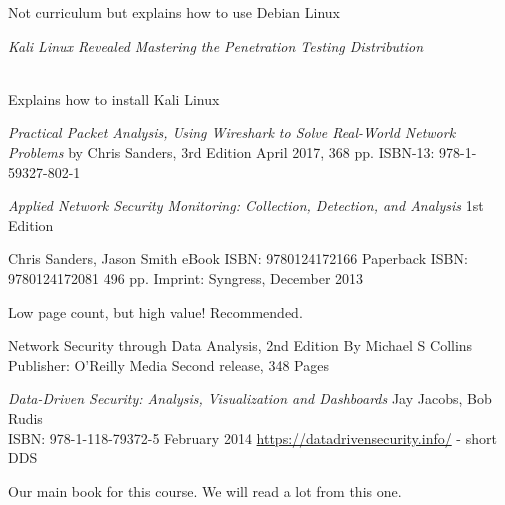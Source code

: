 \documentclass[Screen16to9,17pt]{foils}
\begin{document}
Not curriculum but explains how to use Debian Linux




\emph{Kali Linux Revealed  Mastering the Penetration Testing Distribution}

\\
Explains how to install Kali Linux




\emph{Practical Packet Analysis,
Using Wireshark to Solve Real-World Network Problems}
by Chris Sanders, 3rd Edition
April 2017, 368 pp.
ISBN-13:
978-1-59327-802-1





\emph{Applied Network Security Monitoring: Collection, Detection, and Analysis}
1st Edition

Chris Sanders, Jason Smith
eBook ISBN: 9780124172166
Paperback ISBN: 9780124172081 496 pp.
Imprint: Syngress, December 2013

{\footnotesize{}}




Low page count, but high value! Recommended.

Network Security through Data Analysis, 2nd Edition
By Michael S Collins
Publisher: O'Reilly Media
Second release, 348 Pages



\emph{Data-Driven Security: Analysis, Visualization and Dashboards} Jay Jacobs, Bob Rudis\\
ISBN: 978-1-118-79372-5 February 2014 \url{https://datadrivensecurity.info/} - short DDS

Our main book for this course. We will read a lot from this one.
\end{document}
